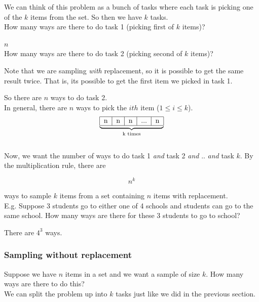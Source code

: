 \documentclass[12pt, letterpaper]{article}
\begin{document}
We can think of this problem as a bunch of tasks where each task is picking one of the \(k\) items from the set. So then we have \(k\) tasks.\\

How many ways are there to do task 1 (picking first of \(k\) items)? 

\(n\)\\

How many ways are there to do task 2 (picking second of \(k\) items)? 

Note that we are sampling \emph{with} replacement, so it is possible to get the same result twice.
That is, its possible to get the first item we picked in task 1. 

So there are \(n\) ways to do task 2.\\

In general, there are \(n\) ways to pick the \(ith\) item (\(1 \leq i \leq k \)).\\

\[
\underbrace{
\begin{tabular}{|c|c|c|c|c|}
	\hline n & n & n & ... & n \\ \hline
\end{tabular}
}_\text{k times}
\]\\

Now, we want the number of ways to do task 1 \emph{and} task 2 \emph{and} .. \emph{and} task \(k\).
By the multiplication rule, there are 

\begin{equation}
n^k
\end{equation}

ways to sample \(k\) items from a set containing \(n\) items with replacement.\\

E.g. Suppose 3 students go to either one of 4 schools and students can go to the same school. How many ways are there for these 3 students to go to school?

There are \(4^3\) ways.

\subsubsection{Sampling without replacement}
Suppose we have \(n\) items in a set and we want a sample of size \(k\). How many ways are there to do this?\\

We can split the problem up into \(k\) tasks just like we did in the previous section. \\
\end{document}
